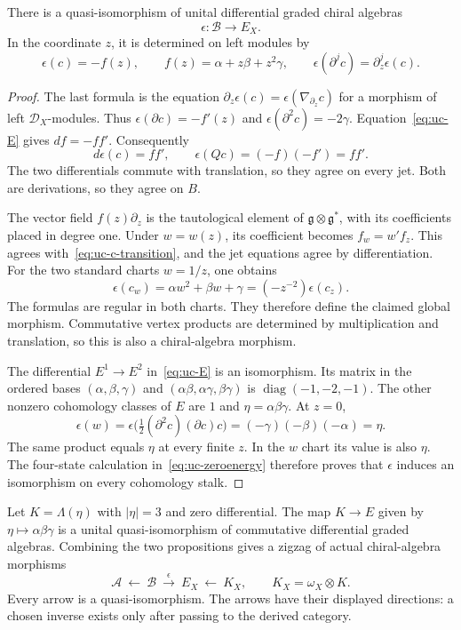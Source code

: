 \begin{proposition}\label{prop:uc-evaluation}
There is a quasi-isomorphism of unital differential graded chiral algebras
\[
 \epsilon:\mathcal B\longrightarrow E_X.
\]
In the coordinate $z$, it is determined on left modules by
\begin{equation}\label{eq:uc-eval}
 \epsilon(c)=-f(z),\qquad
 f(z)=\alpha+z\beta+z^2\gamma,
 \qquad \epsilon(\partial^jc)=\partial_z^j\epsilon(c).
\end{equation}
\end{proposition}

\begin{proof}
The last formula is the equation $\partial_z\epsilon(c)=\epsilon(\nabla_{\partial_z}c)$ for a morphism of left $\mathcal D_X$-modules.
Thus $\epsilon(\partial c)=-f'(z)$ and $\epsilon(\partial^2c)=-2\gamma$.
Equation~\eqref{eq:uc-E} gives $df=-ff'$.
Consequently
\[
 d\epsilon(c)=ff',\qquad
 \epsilon(Qc)=(-f)(-f')=ff'.
\]
The two differentials commute with translation, so they agree on every jet.
Both are derivations, so they agree on $B$.

The vector field $f(z)\partial_z$ is the tautological element of $\mathfrak g\otimes\mathfrak g^*$, with its coefficients placed in degree one.
Under $w=w(z)$, its coefficient becomes $f_w=w'f_z$.
This agrees with~\eqref{eq:uc-c-transition}, and the jet equations agree by differentiation.
For the two standard charts $w=1/z$, one obtains
\[
 \epsilon(c_w)=\alpha w^2+\beta w+\gamma
 =(-z^{-2})\epsilon(c_z).
\]
The formulas are regular in both charts.
They therefore define the claimed global morphism.
Commutative vertex products are determined by multiplication and translation, so this is also a chiral-algebra morphism.

The differential $E^1\to E^2$ in~\eqref{eq:uc-E} is an isomorphism.
Its matrix in the ordered bases $(\alpha,\beta,\gamma)$ and $(\alpha\beta,\alpha\gamma,\beta\gamma)$ is $\operatorname{diag}(-1,-2,-1)$.
The other nonzero cohomology classes of $E$ are $1$ and $\eta=\alpha\beta\gamma$.
At $z=0$,
\[
 \epsilon(w)=\epsilon\bigl(\tfrac12(\partial^2c)(\partial c)c\bigr)
 =(-\gamma)(-\beta)(-\alpha)=\eta.
\]
The same product equals $\eta$ at every finite $z$.
In the $w$ chart its value is also $\eta$.
The four-state calculation in~\eqref{eq:uc-zeroenergy} therefore proves that $\epsilon$ induces an isomorphism on every cohomology stalk.
\end{proof}

Let $K=\Lambda(\eta)$ with $|\eta|=3$ and zero differential.
The map $K\to E$ given by $\eta\mapsto\alpha\beta\gamma$ is a unital quasi-isomorphism of commutative differential graded algebras.
Combining the two propositions gives a zigzag of actual chiral-algebra morphisms
\begin{equation}\label{eq:uc-zigzag}
 \mathcal A\ \longleftarrow\ \mathcal B\
 \xrightarrow{\epsilon}\ E_X\ \longleftarrow\ K_X,
 \qquad K_X=\omega_X\otimes K.
\end{equation}
Every arrow is a quasi-isomorphism.
The arrows have their displayed directions: a chosen inverse exists only after passing to the derived category.

